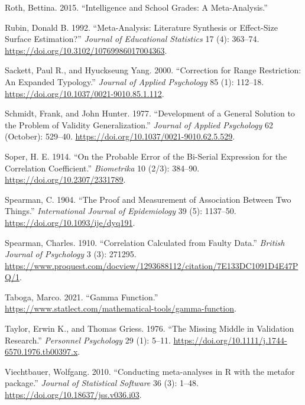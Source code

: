 \documentclass[
  letterpaper,
  DIV=11,
  numbers=noendperiod]{scrreprt}
\newlength{\cslhangindent}
\newlength{\cslentryspacingunit} %
\newenvironment{CSLReferences}[2] %
 {%
  \setlength{\parindent}{0pt}
  \ifodd #1
  \let\oldpar\par
  \def\par{\hangindent=\cslhangindent\oldpar}
  \fi
  \setlength{\parskip}{#2\cslentryspacingunit}
 }%
 {}
\begin{document}
\begin{CSLReferences}{1}{0}
\leavevmode{}%
Roth, Bettina. 2015. {``Intelligence and School Grades: A
Meta-Analysis.''}

\leavevmode{}%
Rubin, Donald B. 1992. {``Meta-Analysis: Literature Synthesis or
Effect-Size Surface Estimation?''} \emph{Journal of Educational
Statistics} 17 (4): 363--74.
\url{https://doi.org/10.3102/10769986017004363}.

\leavevmode{}%
Sackett, Paul R., and Hyuckseung Yang. 2000. {``Correction for Range
Restriction: An Expanded Typology.''} \emph{Journal of Applied
Psychology} 85 (1): 112--18.
\url{https://doi.org/10.1037/0021-9010.85.1.112}.

\leavevmode{}%
Schmidt, Frank, and John Hunter. 1977. {``Development of a General
Solution to the Problem of Validity Generalization.''} \emph{Journal of
Applied Psychology} 62 (October): 529--40.
\url{https://doi.org/10.1037/0021-9010.62.5.529}.

\leavevmode{}%
Soper, H. E. 1914. {``On the Probable Error of the Bi-Serial Expression
for the Correlation Coefficient.''} \emph{Biometrika} 10 (2/3): 384--90.
\url{https://doi.org/10.2307/2331789}.

\leavevmode{}%
Spearman, C. 1904. {``The Proof and Measurement of Association Between
Two Things.''} \emph{International Journal of Epidemiology} 39 (5):
1137--50. \url{https://doi.org/10.1093/ije/dyq191}.

\leavevmode{}%
Spearman, Charles. 1910. {``Correlation Calculated from Faulty Data.''}
\emph{British Journal of Psychology} 3 (3): 271295.
\url{https://www.proquest.com/docview/1293688112/citation/7E133DC1091D4E47PQ/1}.

\leavevmode{}%
Taboga, Marco. 2021. {``Gamma Function.''}
\url{https://www.statlect.com/mathematical-tools/gamma-function}.

\leavevmode{}%
Taylor, Erwin K., and Thomas Griess. 1976. {``The Missing Middle in
Validation Research.''} \emph{Personnel Psychology} 29 (1): 5--11.
\url{https://doi.org/10.1111/j.1744-6570.1976.tb00397.x}.

\leavevmode{}%
Viechtbauer, Wolfgang. 2010. {``Conducting meta-analyses in R with the
metafor package.''} \emph{Journal of Statistical Software} 36 (3):
1--48. \url{https://doi.org/10.18637/jss.v036.i03}.


\end{CSLReferences}
\end{document}
